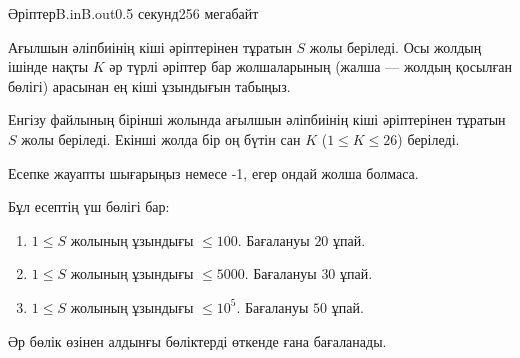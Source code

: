 \begin{problem}{Әріптер}{B.in}{B.out}{0.5 секунд}{256 мегабайт}

Ағылшын әліпбиінің кіші әріптерінен тұратын $S$ жолы беріледі. Осы жолдың ішінде нақты $K$ әр түрлі әріптер бар жолшаларының (жалша --- жолдың қосылған бөлігі) арасынан ең кіші ұзындығын табыңыз.

\InputFile
Енгізу файлының бірінші жолында ағылшын әліпбиінің кіші әріптерінен тұратын $S$ жолы беріледі. Екінші жолда бір оң бүтін сан $K$ ($ 1\le K \le 26$) беріледі.

\OutputFile
Есепке жауапты шығарыңыз немесе -1, егер ондай жолша болмаса.

\Examples

\begin{example}
%
\end{example}


\Scoring
Бұл есептің үш бөлігі бар:
\begin{enumerate}
\item $1 \le S$ жолының ұзындығы $\le 100$. Бағалануы $20$ ұпай.
\item $1 \le S$ жолының ұзындығы $\le 5000$. Бағалануы $30$ ұпай.
\item $1 \le S$ жолының ұзындығы $\le 10^5$. Бағалануы $50$ ұпай.
\end{enumerate}

Әр бөлік өзінен алдынғы бөліктерді өткенде ғана бағаланады.

\end{problem}
